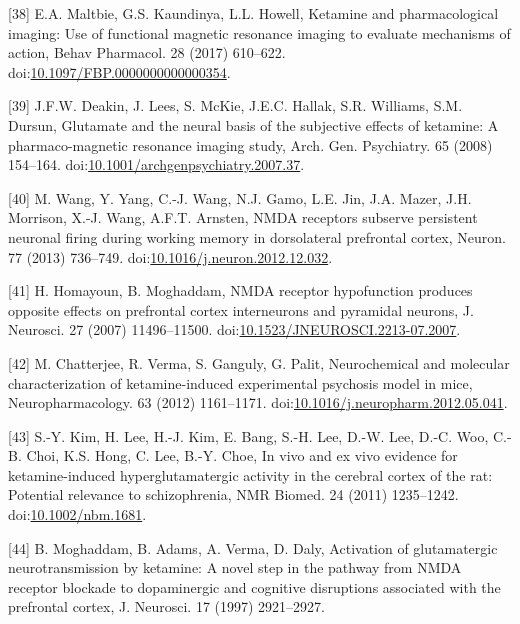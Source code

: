 \documentclass[man]{apa6}
\begin{document}
\leavevmode\hypertarget{ref-maltbieKetaminePharmacologicalImaging2017}{}%
{[}38{]} E.A. Maltbie, G.S. Kaundinya, L.L. Howell, Ketamine and pharmacological imaging: Use of functional magnetic resonance imaging to evaluate mechanisms of action, Behav Pharmacol. 28 (2017) 610--622. doi:\href{https://doi.org/10.1097/FBP.0000000000000354}{10.1097/FBP.0000000000000354}.

\leavevmode\hypertarget{ref-deakinGlutamateNeuralBasis2008}{}%
{[}39{]} J.F.W. Deakin, J. Lees, S. McKie, J.E.C. Hallak, S.R. Williams, S.M. Dursun, Glutamate and the neural basis of the subjective effects of ketamine: A pharmaco-magnetic resonance imaging study, Arch. Gen. Psychiatry. 65 (2008) 154--164. doi:\href{https://doi.org/10.1001/archgenpsychiatry.2007.37}{10.1001/archgenpsychiatry.2007.37}.

\leavevmode\hypertarget{ref-wangNMDAReceptorsSubserve2013}{}%
{[}40{]} M. Wang, Y. Yang, C.-J. Wang, N.J. Gamo, L.E. Jin, J.A. Mazer, J.H. Morrison, X.-J. Wang, A.F.T. Arnsten, NMDA receptors subserve persistent neuronal firing during working memory in dorsolateral prefrontal cortex, Neuron. 77 (2013) 736--749. doi:\href{https://doi.org/10.1016/j.neuron.2012.12.032}{10.1016/j.neuron.2012.12.032}.

\leavevmode\hypertarget{ref-homayounNMDAReceptorHypofunction2007}{}%
{[}41{]} H. Homayoun, B. Moghaddam, NMDA receptor hypofunction produces opposite effects on prefrontal cortex interneurons and pyramidal neurons, J. Neurosci. 27 (2007) 11496--11500. doi:\href{https://doi.org/10.1523/JNEUROSCI.2213-07.2007}{10.1523/JNEUROSCI.2213-07.2007}.

\leavevmode\hypertarget{ref-chatterjeeNeurochemicalMolecularCharacterization2012}{}%
{[}42{]} M. Chatterjee, R. Verma, S. Ganguly, G. Palit, Neurochemical and molecular characterization of ketamine-induced experimental psychosis model in mice, Neuropharmacology. 63 (2012) 1161--1171. doi:\href{https://doi.org/10.1016/j.neuropharm.2012.05.041}{10.1016/j.neuropharm.2012.05.041}.

\leavevmode\hypertarget{ref-kimVivoExVivo2011}{}%
{[}43{]} S.-Y. Kim, H. Lee, H.-J. Kim, E. Bang, S.-H. Lee, D.-W. Lee, D.-C. Woo, C.-B. Choi, K.S. Hong, C. Lee, B.-Y. Choe, In vivo and ex vivo evidence for ketamine-induced hyperglutamatergic activity in the cerebral cortex of the rat: Potential relevance to schizophrenia, NMR Biomed. 24 (2011) 1235--1242. doi:\href{https://doi.org/10.1002/nbm.1681}{10.1002/nbm.1681}.

\leavevmode\hypertarget{ref-moghaddamActivationGlutamatergicNeurotransmission1997}{}%
{[}44{]} B. Moghaddam, B. Adams, A. Verma, D. Daly, Activation of glutamatergic neurotransmission by ketamine: A novel step in the pathway from NMDA receptor blockade to dopaminergic and cognitive disruptions associated with the prefrontal cortex, J. Neurosci. 17 (1997) 2921--2927.
\end{document}
